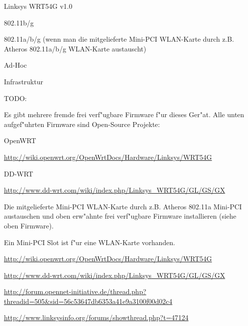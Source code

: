 %
%
\begin{wlandevice}{Linksys WRT54G v1.0}


\begin{wlanieeestandard}
\item 802.11b/g
\item 802.11a/b/g (wenn man die mitgelieferte Mini-PCI WLAN-Karte
durch z.B. Atheros 802.11a/b/g WLAN-Karte austauscht)
\end{wlanieeestandard}

\begin{wlanmode}
\item Ad-Hoc
\item Infrastruktur
\end{wlanmode}

TODO: 

\begin{wlanfirmware}
\item
Es gibt mehrere fremde frei verf"ugbare Firmware f"ur dieses Ger"at.
Alle unten aufgef"uhrten Firmware sind Open-Source Projekte:

OpenWRT

\url{http://wiki.openwrt.org/OpenWrtDocs/Hardware/Linksys/WRT54G}

DD-WRT

\url{http://www.dd-wrt.com/wiki/index.php/Linksys_WRT54G/GL/GS/GX}
\end{wlanfirmware}


\begin{wlaninstall}
\item
Die mitgelieferte Mini-PCI WLAN-Karte durch z.B. Atheros 802.11a Mini-PCI
austauschen und oben erw"ahnte frei verf"ugbare Firmware installieren
(siehe oben Firmware).
\end{wlaninstall}

\begin{wlanextrainfo}
\item
Ein Mini-PCI Slot ist f"ur eine WLAN-Karte vorhanden.
\end{wlanextrainfo}

\begin{wlanlink}
\item \url{http://wiki.openwrt.org/OpenWrtDocs/Hardware/Linksys/WRT54G}
\item \url{http://www.dd-wrt.com/wiki/index.php/Linksys_WRT54G/GL/GS/GX}
\item \url{http://forum.opennet-initiative.de/thread.php?threadid=505&sid=56c53647db6353a41e9a3100f00d02c4}
\item \url{http://www.linksysinfo.org/forums/showthread.php?t=47124}
\end{wlanlink}

\end{wlandevice}

